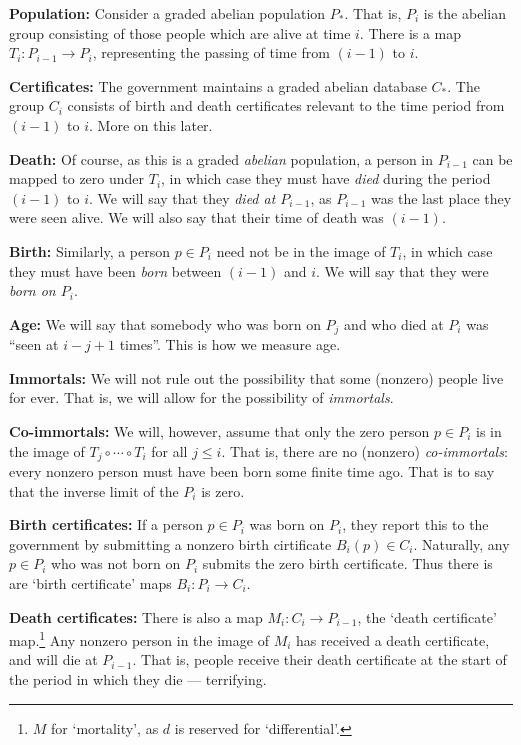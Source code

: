 \documentclass[11pt]{article}
\begin{document}
\Bullet \textbf{Population:} Consider a graded abelian population $P_*$. That
is, $P_i$ is the abelian group consisting of those people which are alive at
time $i$. There is a map $T_{i}:P_{i-1}\to P_{i}$, representing the passing of
time from $(i-1)$ to $i$.

\Bullet \textbf{Certificates:} The government maintains a graded abelian
database $C_*$. The group $C_i$ consists of birth and death certificates
relevant to the time period from $(i-1)$ to $i$. More on this later.

\Bullet \textbf{Death:} Of course, as this is a graded \emph{abelian}
population, a person in $P_{i-1}$ can be mapped to zero under $T_{i}$, in which
case they must have \emph{died} during the period $(i-1)$ to $i$. We will say
that they \emph{died at $P_{i-1}$}, as $P_{i-1}$ was the last place they were
seen alive. We will also say that their time of death was $(i-1)$.

\Bullet \textbf{Birth:} Similarly, a person $p\in P_i$ need not be in the image
of $T_{i}$, in which case they must have been \emph{born} between $(i-1)$ and
$i$. We will say that they were \emph{born on $P_i$}.

\Bullet \textbf{Age:} We will say that somebody who was born on $P_j$ and who
died at $P_i$ was ``seen at $i-j+1$ times''. This is how we measure age.

\Bullet \textbf{Immortals:} We will not rule out the possibility that some
(nonzero) people live for ever. That is, we will allow for the possibility of
\emph{immortals}.

\Bullet \textbf{Co-immortals:} We will, however, assume that only the zero
person $p\in P_i$ is in the image of $T_{j}\circ\cdots\circ T_i$ for all $j\leq
i$. That is, there are no (nonzero) \emph{co-immortals}: every nonzero person
must have been born some finite time ago. That is to say that the inverse limit
of the $P_i$ is zero.

\Bullet \textbf{Birth certificates:} If a person $p\in P_{i}$ was born on $P_i$,
they report this to the government by submitting a nonzero birth cirtificate
$B_{i}(p)\in C_i$. Naturally, any $p\in P_{i}$ who was not born on $P_i$ submits
the zero birth certificate. Thus there is are `birth certificate' maps
$B_i:P_i\to C_i$.

\Bullet \textbf{Death certificates:} There is also a map $M_{i}:C_{i}\to
P_{i-1}$, the `death certificate' map.\footnote{$M$ for `mortality', as $d$ is
reserved for `differential'.} Any nonzero person in the image of $M_{i}$ has
received a death certificate, and will die at $P_{i-1}$. That is, people receive
their death certificate at the start of the period in which they die ---
terrifying.
\end{document}
